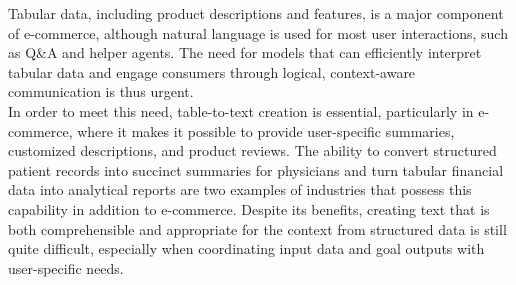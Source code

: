 
Tabular data, including product descriptions and features, is a major component of e-commerce, although natural language is used for most user interactions, such as Q\&A and helper agents. The need for models that can efficiently interpret tabular data and engage consumers through logical, context-aware communication is thus urgent.
\\

In order to meet this need, table-to-text creation is essential, particularly in e-commerce, where it makes it possible to provide user-specific summaries, customized descriptions, and product reviews. The ability to convert structured patient records into succinct summaries for physicians \citep{he2023survey} and turn tabular financial data into analytical reports \citep{Varshney_2024} are two examples of industries that possess this capability in addition to e-commerce. Despite its benefits, creating text that is both comprehensible and appropriate for the context from structured data is still quite difficult, especially when coordinating input data and goal outputs with user-specific needs.
\\

